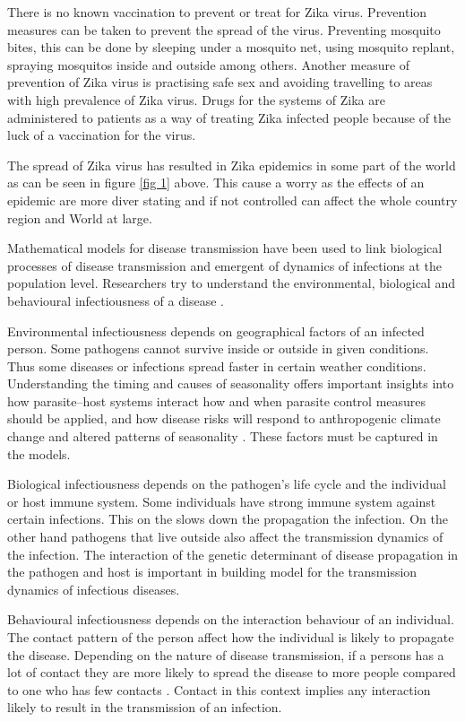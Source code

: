 There is no known vaccination to prevent or treat for Zika virus. Prevention measures can be taken to prevent the spread of the virus. Preventing mosquito bites, this can be done by sleeping under a mosquito net, using mosquito replant, spraying mosquitos inside and outside among others. Another measure of prevention of Zika virus is practising safe sex and avoiding travelling to areas with high prevalence of Zika virus. Drugs for the systems of Zika are administered to patients as a way of treating Zika infected people because of the luck of a vaccination for the virus.


The spread of Zika virus has resulted in Zika epidemics in some part of the world as can be seen in figure \ref{fig 1} above. This cause a worry as the effects of an epidemic are more diver stating and if not controlled can affect the whole country region and World at large. 


 
 Mathematical models for disease transmission have been used to link biological processes of disease transmission and emergent of dynamics of infections at the population level. Researchers try to understand the environmental, biological  and behavioural infectiousness of a disease .
 
  Environmental infectiousness depends on geographical factors of an infected person. Some pathogens cannot survive inside or outside in given conditions. Thus some diseases or infections spread faster in certain weather conditions\citep{grass}. Understanding the timing and causes of seasonality offers important insights into how parasite–host systems interact how and when parasite control measures should be applied, and how disease risks will respond to anthropogenic climate change and altered patterns of seasonality \citep{altizer}. These factors must be captured in the models.
  
  Biological infectiousness depends on the pathogen's life cycle and the individual or host immune system. Some individuals have strong immune system against certain infections. This on the slows down the propagation the infection. On the other hand pathogens that live outside also affect the transmission dynamics of the infection.  The interaction of the genetic determinant of disease propagation in the pathogen and host is important in building model for the transmission dynamics of infectious diseases.
  
Behavioural infectiousness depends on the interaction behaviour of an individual. The contact pattern of the person affect how the individual is likely to propagate   the disease. Depending on the nature of disease transmission, if a persons has a lot of contact they are more likely to spread the disease to more people compared to one who has few contacts \citep{johnson2001sexual}. Contact in this context implies any interaction likely to result in the transmission of an infection.

